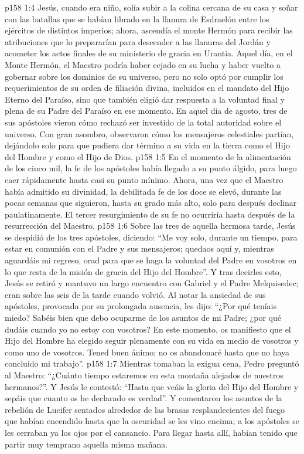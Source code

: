 \vs p158 1:4 Jesús, cuando era niño, solía subir a la colina cercana de su casa y soñar con las batallas que se habían librado en la llanura de Esdraelón entre los ejércitos de distintos imperios; ahora, ascendía el monte Hermón para recibir las atribuciones que lo prepararían para descender a las llanuras del Jordán y acometer los actos finales de su ministerio de gracia en Urantia. Aquel día, en el Monte Hermón, el Maestro podría haber cejado en su lucha y haber vuelto a gobernar sobre los dominios de su universo, pero no solo optó por cumplir los requerimientos de su orden de filiación divina, incluidos en el mandato del Hijo Eterno del Paraíso, sino que también eligió dar respuesta a la voluntad final y plena de su Padre del Paraíso en ese momento. En aquel día de agosto, tres de sus apóstoles vieron cómo rechazó ser investido de la total autoridad sobre el universo. Con gran asombro, observaron cómo los mensajeros celestiales partían, dejándolo solo para que pudiera dar término a su vida en la tierra como el Hijo del Hombre y como el Hijo de Dios.
\vs p158 1:5 En el momento de la alimentación de los cinco mil, la fe de los apóstoles había llegado a su punto álgido, para luego caer rápidamente hasta casi su punto mínimo. Ahora, una vez que el Maestro había admitido su divinidad, la debilitada fe de los doce se elevó, durante las pocas semanas que siguieron, hasta su grado más alto, solo para después declinar paulatinamente. El tercer resurgimiento de su fe no ocurriría hasta después de la resurrección del Maestro.
\vs p158 1:6 Sobre las tres de aquella hermosa tarde, Jesús se despidió de los tres apóstoles, diciendo: “Me voy solo, durante un tiempo, para estar en comunión con el Padre y sus mensajeros; quedaos aquí y, mientras aguardáis mi regreso, orad para que se haga la voluntad del Padre en vosotros en lo que resta de la misión de gracia del Hijo del Hombre”. Y tras decirles esto, Jesús se retiró y mantuvo un largo encuentro con Gabriel y el Padre Melquisedec; eran sobre las seis de la tarde cuando volvió. Al notar la ansiedad de sus apóstoles, provocada por su prolongada ausencia, les dijo: “¿Por qué teníais miedo? Sabéis bien que debo ocuparme de los asuntos de mi Padre; ¿por qué dudáis cuando yo no estoy con vosotros? En este momento, os manifiesto que el Hijo del Hombre ha elegido seguir plenamente con su vida en medio de vosotros y como uno de vosotros. Tened buen ánimo; no os abandonaré hasta que no haya concluido mi trabajo”.
\vs p158 1:7 Mientras tomaban la exigua cena, Pedro preguntó al Maestro: “¿Cuánto tiempo estaremos en esta montaña alejados de nuestros hermanos?”. Y Jesús le contestó: “Hasta que veáis la gloria del Hijo del Hombre y sepáis que cuanto os he declarado es verdad”. Y comentaron los asuntos de la rebelión de Lucifer sentados alrededor de las brasas resplandecientes del fuego que habían encendido hasta que la oscuridad se les vino encima; a los apóstoles se les cerraban ya los ojos por el cansancio. Para llegar hasta allí, habían tenido que partir muy temprano aquella misma mañana.
